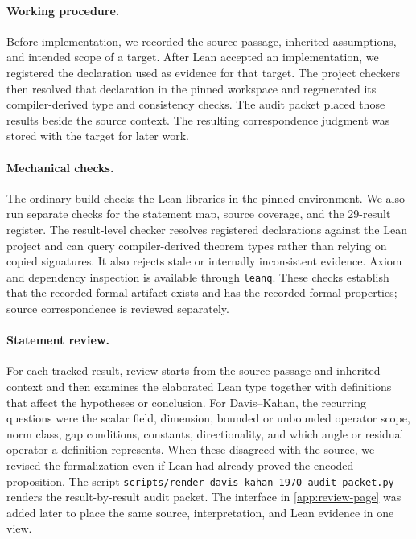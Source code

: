 \paragraph{Working procedure.}
Before implementation, we recorded the source passage, inherited assumptions,
and intended scope of a target.  After Lean accepted an implementation, we
registered the declaration used as evidence for that target.  The project
checkers then resolved that declaration in the pinned workspace and regenerated
its compiler-derived type and consistency checks.  The audit packet placed those
results beside the source context.  The resulting correspondence judgment was
stored with the target for later work.

\paragraph{Mechanical checks.}
The ordinary build checks the Lean libraries in the pinned environment.  We also
run separate checks for the statement map, source coverage, and the 29-result
register.  The result-level checker resolves registered declarations against the
Lean project and can query compiler-derived theorem types rather than relying on
copied signatures.  It also rejects stale or internally inconsistent evidence.
Axiom and dependency inspection is available through \texttt{leanq}.  These
checks establish that the recorded formal artifact exists and has the recorded
formal properties; source correspondence is reviewed separately.

\paragraph{Statement review.}
For each tracked result, review starts from the source passage and inherited
context and then examines the elaborated Lean type together with definitions
that affect the hypotheses or conclusion.  For Davis--Kahan, the recurring
questions were the scalar field, dimension, bounded or unbounded operator scope,
norm class, gap conditions, constants, directionality, and which angle or
residual operator a definition represents.  When these disagreed with the
source, we revised the formalization even if Lean had already proved the encoded
proposition.  The script
\texttt{scripts/render\_davis\_kahan\_1970\_audit\_packet.py} renders the
result-by-result audit packet.  The interface in \cref{app:review-page} was added
later to place the same source, interpretation, and Lean evidence in one view.

